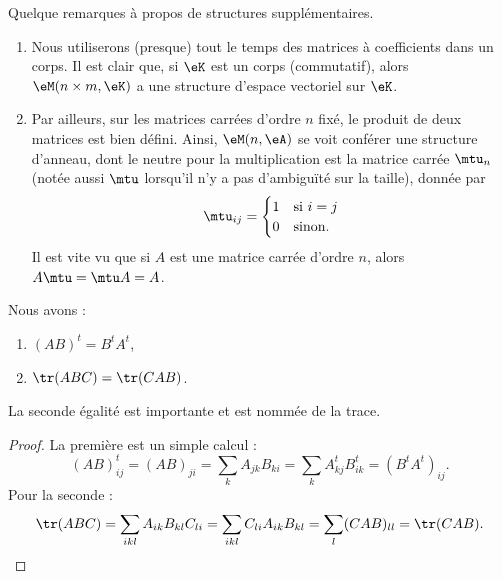 \begin{remark}
    Quelque remarques à propos de structures supplémentaires.
\begin{enumerate}
    \item Nous utiliserons (presque) tout le temps des matrices à coefficients dans un corps. Il est clair que, si \( \eK \) est un corps (commutatif), alors \( \eM(n\times m,\eK) \) a une structure d'espace vectoriel sur \( \eK \).
    \item Par ailleurs, sur les matrices carrées d'ordre \( n \) fixé, le produit de deux matrices est bien défini. Ainsi, \( \eM(n,\eA)\) se voit conférer une structure d'anneau, dont le neutre pour la multiplication est la matrice carrée \( \mtu_n\) (notée aussi \( \mtu\) lorsqu'il n'y a pas d'ambiguïté sur la taille), donnée par
\begin{equation}
    \mtu_{ij}=\begin{cases}
        1    &   \text{si } i=j\\
        0    &    \text{sinon.}
    \end{cases}
\end{equation}
Il est vite vu que si \( A\) est une matrice carrée d'ordre \( n \), alors \( A\mtu=\mtu A=A\).
\end{enumerate}
\end{remark}

\begin{lemma}\label{LEMooUXDRooWZbMVN}
    Nous avons :
    \begin{enumerate}
        \item
            \( (AB)^t=B^tA^t\),
        \item
            \( \tr(ABC)=\tr(CAB)\).
    \end{enumerate}
    La seconde égalité est importante et est nommée  de la trace.
\end{lemma}

\begin{proof}
    La première est un simple calcul :
    \begin{equation}
        (AB)^t_{ij}=(AB)_{ji}=\sum_kA_{jk}B_{ki}=\sum_kA^t_{kj}B^t_{ik}=(B^tA^t)_{ij}.
    \end{equation}
    Pour la seconde :
    \begin{equation}
        \tr(ABC)=\sum_{ikl}A_{ik}B_{kl}C_{li}=\sum_{ikl}C_{li}A_{ik}B_{kl}=\sum_l(CAB)_{ll}=\tr(CAB).
    \end{equation}
\end{proof}

